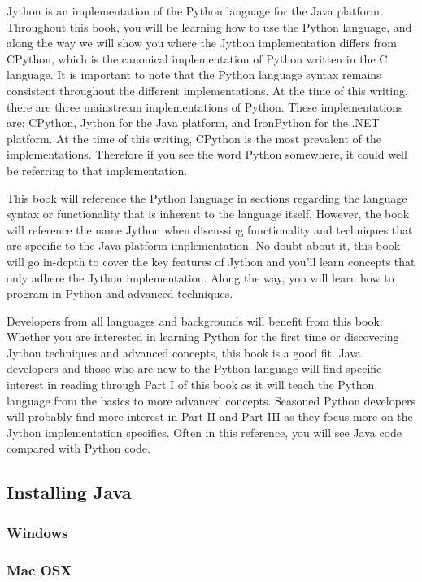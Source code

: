 Jython is an implementation of the Python language for the Java platform. Throughout this book, you will be learning how to use the Python language, and along the way we will show you where the Jython implementation differs from CPython, which is the canonical implementation of Python written in the C language. It is important to note that the Python language syntax remains consistent throughout the different implementations. At the time of this writing, there are three mainstream implementations of Python. These implementations are: CPython, Jython for the Java platform, and IronPython for the .NET platform. At the time of this writing, CPython is the most prevalent of the implementations. Therefore if you see the word Python somewhere, it could well be referring to that implementation.

This book will reference the Python language in sections regarding the language syntax or functionality that is inherent to the language itself. However, the book will reference the name Jython when discussing functionality and techniques that are specific to the Java platform implementation. No doubt about it, this book will go in-depth to cover the key features of Jython and you’ll learn concepts that only adhere the Jython implementation. Along the way, you will learn how to program in Python and advanced techniques.

Developers from all languages and backgrounds will benefit from this book. Whether you are interested in learning Python for the first time or discovering Jython techniques and advanced concepts, this book is a good fit. Java developers and those who are new to the Python language will find specific interest in reading through Part I of this book as it will teach the Python language from the basics to more advanced concepts. Seasoned Python developers will probably find more interest in Part II and Part III as they focus more on the Jython implementation specifics. Often in this reference, you will see Java code compared with Python code.


\subsection{Installing Java}

\subsubsection{Windows}

\subsubsection{Mac OSX}

